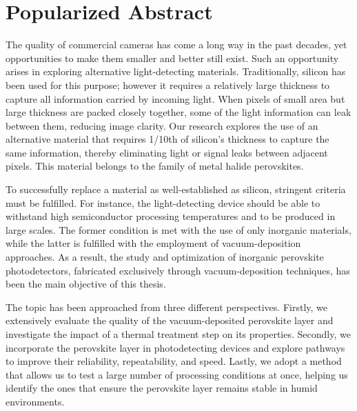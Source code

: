 \chapter{Popularized Abstract}\label{ch:popabstract}

The quality of commercial cameras has come a long way in the past decades, yet opportunities to make them smaller and better still exist. Such an opportunity arises in exploring alternative light-detecting materials. Traditionally, silicon has been used for this purpose; however it requires a relatively large thickness to capture all information carried by incoming light. When pixels of small area but large thickness are packed closely together, some of the light information can leak between them, reducing image clarity. Our research explores the use of an alternative material that requires 1/10th of silicon's thickness to capture the same information, thereby eliminating light or signal leaks between adjacent pixels. This material belongs to the family of metal halide perovskites. 

To successfully replace a material as well-established as silicon, stringent criteria must be fulfilled. For instance, the light-detecting device should be able to withstand high semiconductor processing temperatures and to be produced in large scales. The former condition is met with the use of only inorganic materials, while the latter is fulfilled with the employment of vacuum-deposition approaches. As a result, the study and optimization of inorganic perovskite photodetectors, fabricated exclusively through vacuum-deposition techniques, has been the main objective of this thesis. 

The topic has been approached from three different perspectives. Firstly, we extensively evaluate the quality of the vacuum-deposited perovskite layer and investigate the impact of a thermal treatment step on its properties. Secondly, we incorporate the perovskite layer in photodetecting devices and explore pathways to improve their reliability, repeatability, and speed. Lastly, we adopt a method that allows us to test a large number of processing conditions at once, helping us identify the ones that ensure the perovskite layer remains stable in humid environments.


\cleardoublepage
